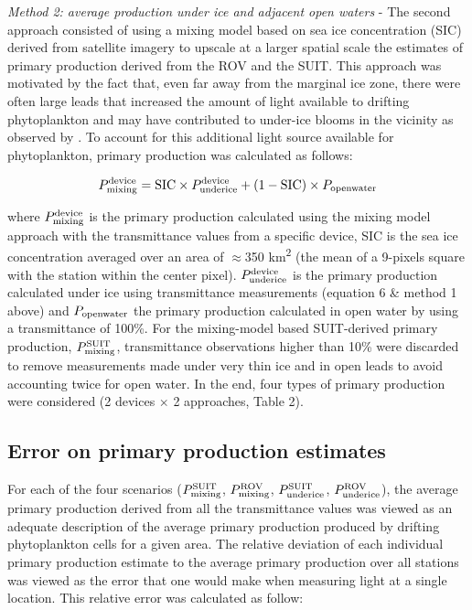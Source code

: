 \documentclass[draft]{agujournal2018}
\newcommand{\ppundericedevice}{\ensuremath{P_{\textnormal{\scriptsize underice}}^{\textnormal{\scriptsize device}}}}
\newcommand{\ppmixingdevice}{\ensuremath{P_{\textnormal{\scriptsize mixing}}^{\textnormal{\scriptsize device}}}}
\newcommand{\ppmixingsuit}{\ensuremath{P_{\textnormal{\scriptsize mixing}}^{\textnormal{\scriptsize SUIT}}}}
\newcommand{\ppmixingrov}{\ensuremath{P_{\textnormal{\scriptsize mixing}}^{\textnormal{\scriptsize ROV}}}}
\newcommand{\ppsuitunderice}{\ensuremath{P_{\textnormal{\scriptsize underice}}^{\textnormal{\scriptsize SUIT}}}}
\newcommand{\pprovunderice}{\ensuremath{P_{\textnormal{\scriptsize underice}}^{\textnormal{\scriptsize ROV}}}}
\newcommand{\ppopenwater}{\ensuremath{P_{\textnormal{\scriptsize openwater}}}}
\begin{document}
\textit{Method 2: average production under ice and adjacent open waters} - The second approach consisted of using a mixing model based on sea ice concentration (SIC) derived from satellite imagery to upscale at a larger spatial scale the estimates of primary production derived from the ROV and the SUIT. This approach was motivated by the fact that, even far away from the marginal ice zone, there were often large leads that increased the amount of light available to drifting phytoplankton and may have contributed to under-ice blooms in the vicinity as observed by \citet{Assmy2017}. To account for this additional light source available for phytoplankton, primary production was calculated as follows:

\begin{linenomath*}
    \begin{equation}
		\ppmixingdevice{} = \text{SIC} \times \ppundericedevice{} + (1 - \text{SIC}) \times \ppopenwater{}
	\end{equation}
\end{linenomath*}

where \ppmixingdevice{} is the primary production calculated using the mixing model approach with the transmittance values from a specific device, SIC is the sea ice concentration averaged over an area of $\approx$350 km\textsuperscript{2} (the mean of a 9-pixels square with the station within the center pixel). \ppundericedevice{} is the primary production calculated under ice using transmittance measurements (equation 6 \& method 1 above) and \ppopenwater{} the primary production calculated in open water by using a transmittance of 100\%. For the mixing-model based SUIT-derived primary production, \ppmixingsuit{}, transmittance observations higher than 10\% were discarded to remove measurements made under very thin ice and in open leads to avoid accounting twice for open water. In the end, four types of primary production were considered (2 devices $\times$ 2 approaches, Table 2).

\subsection{Error on primary production estimates}

For each of the four scenarios (\ppmixingsuit{}, \ppmixingrov{}, \ppsuitunderice{}, \pprovunderice{}), the average primary production derived from all the transmittance values was viewed as an adequate description of the average primary production produced by drifting phytoplankton cells for a given area. The relative deviation of each individual primary production estimate to the average primary production over all stations was viewed as the error that one would make when measuring light at a single location. This relative error was calculated as follow:
\end{document}
